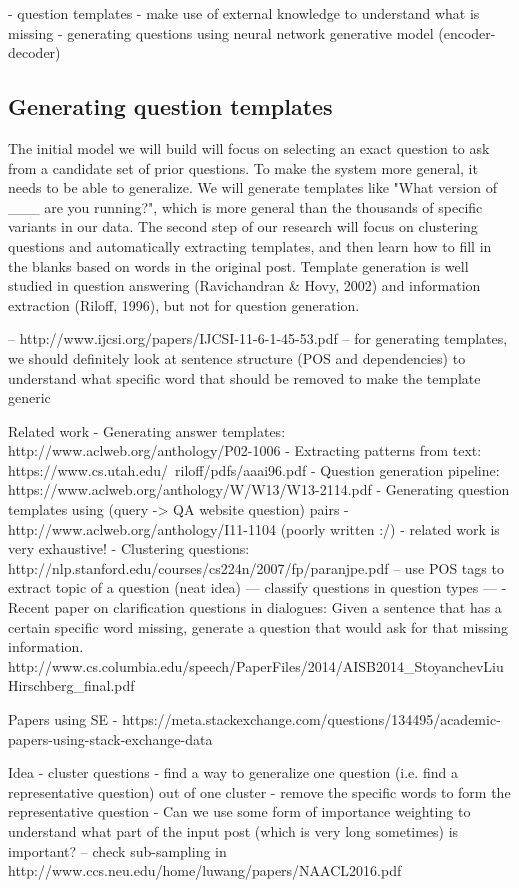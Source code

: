 \documentclass[11pt]{article}
\begin{document}
\iffalse
- question templates
- make use of external knowledge to understand what is missing
- generating questions using neural network generative model (encoder-decoder)

\subsection{Generating question templates}

The initial model we will build will focus on selecting an exact question to ask from a candidate set of prior questions. To make the system more general, it needs to be able to generalize. We will generate templates like "What version of \_\_\_ are you running?", which is more general than the thousands of specific variants in our data. The second step of our research will focus on clustering questions and automatically extracting templates, and then learn how to fill in the blanks based on words in the original post. Template generation is well studied in question answering (Ravichandran \& Hovy, 2002) and information extraction (Riloff, 1996), but not for question generation.

-- http://www.ijcsi.org/papers/IJCSI-11-6-1-45-53.pdf
-- for generating templates, we should definitely look at sentence structure (POS and dependencies) to understand what specific word that should be removed to make the template generic

Related work
- Generating answer templates: http://www.aclweb.org/anthology/P02-1006
- Extracting patterns from text: https://www.cs.utah.edu/~riloff/pdfs/aaai96.pdf
- Question generation pipeline: https://www.aclweb.org/anthology/W/W13/W13-2114.pdf
- Generating question templates using (query -> QA website question) pairs - http://www.aclweb.org/anthology/I11-1104 (poorly written :/) - related work is very exhaustive!
- Clustering questions: http://nlp.stanford.edu/courses/cs224n/2007/fp/paranjpe.pdf -- use POS tags to extract topic of a question (neat idea) --- classify questions in question types --- 
- Recent paper on clarification questions in dialogues: Given a sentence that has a certain specific word missing, generate a question that would ask for that missing information. http://www.cs.columbia.edu/speech/PaperFiles/2014/AISB2014_StoyanchevLiuHirschberg_final.pdf

Papers using SE - https://meta.stackexchange.com/questions/134495/academic-papers-using-stack-exchange-data

Idea
- cluster questions
- find a way to generalize one question (i.e. find a representative question) out of one cluster
- remove the specific words to form the representative question
- Can we use some form of importance weighting to understand what part of the input post (which is very long sometimes) is important? -- check sub-sampling in http://www.ccs.neu.edu/home/luwang/papers/NAACL2016.pdf
\end{document}
